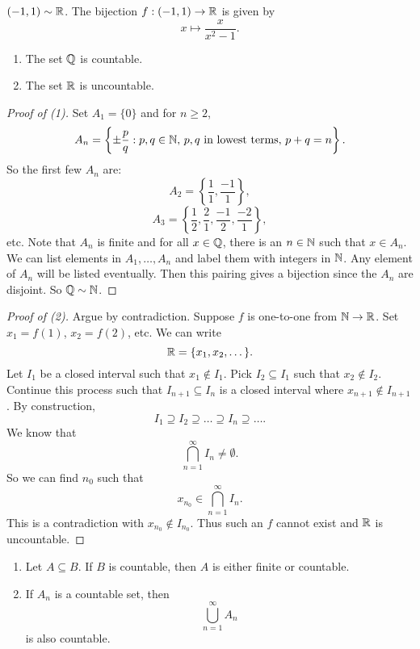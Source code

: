 \begin{example}
  $(-1, 1) \sim \mathbb{R}$.
  The bijection  $f : (-1, 1) \to \mathbb{R}$ is given by
  \[x \mapsto \frac{x}{x^2 - 1}.\]
\end{example}

\begin{theorem}\leavevmode
  \begin{enumerate}
    \item The set $\mathbb{Q}$ is countable.
    \item The set $\mathbb{R}$ is uncountable.
  \end{enumerate}
\end{theorem}

\begin{proof}[Proof of (1)]
  Set $A_1 = \{0\}$ and for $n \ge 2$,
  \[A_n = \left\{\pm \frac{p}{q} : p, q \in \mathbb{N},\, \text{$p, q$ in lowest terms},\, p + q = n\right\}.\]
  So the first few $A_n$ are:
  \[A_2 = \left\{\frac{1}{1}, \frac{-1}{1}\right\},\]
  \[A_3 = \left\{\frac{1}{2}, \frac{2}{1}, \frac{-1}{2}, \frac{-2}{1}\right\},\]
  etc. Note that $A_n$ is finite and
  for all
  $x \in \mathbb{Q}$, there is an $n \in \mathbb{N}$ such that
  $x \in A_n$.
  We can list elements in $A_1, \dots, A_n$ and label
  them with
  integers in $\mathbb{N}$. Any element of $A_n$ will be
  listed eventually. Then this pairing gives
  a bijection since the $A_n$ are disjoint.
  So $\mathbb{Q} \sim \mathbb{N}$.
\end{proof}

\begin{proof}[Proof of (2)]
  Argue by contradiction. Suppose $f$ is one-to-one from
  $\mathbb{N} \to \mathbb{R}$.
  Set $x_1 = f(1)$, $x_2 = f(2)$, etc. We can write
  \[\mathbb{R} = \{x_1, x_2, \dots\}.\]
  Let $I_1$ be a closed interval such that
  $x_1 \notin I_1$. Pick $I_2 \subseteq I_1$ such that
  $x_2 \notin I_2$. Continue this process such that
  $I_{n+1} \subseteq I_n$ is a closed interval where
  $x_{n+1} \notin I_{n+1}$.
  By construction,
  \[I_1 \supseteq I_2 \supseteq \dots \supseteq I_n \supseteq \dots.\]
  We know that
  \[\bigcap_{n = 1}^\infty I_n \ne \emptyset.\]
  So we can find $n_0$ such that
  \[x_{n_0} \in \bigcap_{n = 1}^\infty I_n.\]
  This is a contradiction with $x_{n_0} \notin I_{n_0}$.
  Thus such an $f$ cannot exist and $\mathbb{R}$ is
  uncountable.
\end{proof}

\begin{theorem}\leavevmode
  \begin{enumerate}
    \item Let $A \subseteq B$. If $B$ is countable, then
      $A$ is either finite or countable.
    \item If $A_n$ is a countable set, then
      \[\bigcup_{n=1}^\infty A_n\]
      is also countable.
  \end{enumerate}
\end{theorem}

